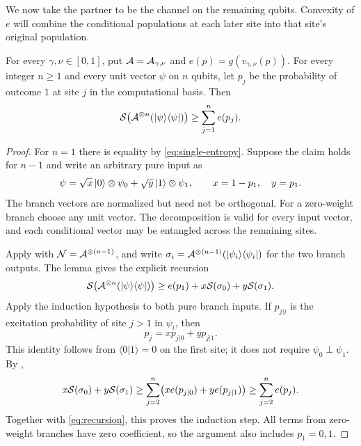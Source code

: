 We now take the partner to be the channel on the remaining qubits.
Convexity of $e$ will combine the conditional populations at each later
site into that site's original population.

\begin{proposition}\label{prop:pure-bound}
For every $\gamma,\nu\in[0,1]$, put $\mathcal A=\mathcal A_{\gamma,\nu}$ and
$e(p)=g(v_{\gamma,\nu}(p))$. For every integer $n\ge1$ and
every unit vector $\psi$ on $n$ qubits,
let $p_j$ be the probability of outcome $1$ at site $j$ in the
computational basis. Then
\begin{equation}\label{eq:pure-bound}
 \mathcal S\bigl(\mathcal A^{\otimes n}(\lvert \psi\rangle\langle \psi\rvert)\bigr)
 \ge\sum_{j=1}^n e(p_j).
\end{equation}
\end{proposition}

\begin{proof}
For $n=1$ there is equality by \eqref{eq:single-entropy}. Suppose the
claim holds for $n-1$ and write an arbitrary pure input as
\begin{equation}\label{eq:branch-decomposition}
 \psi=\sqrt x\,\lvert 0\rangle\otimes\psi_0
          +\sqrt y\,\lvert 1\rangle\otimes\psi_1,
 \qquad x=1-p_1,\quad y=p_1.
\end{equation}
The branch vectors are normalized but need not be orthogonal. For a
zero-weight branch choose any unit vector. The decomposition is valid
for every input vector, and each conditional vector may be entangled
across the remaining sites.

Apply  with
$\mathcal N=\mathcal A^{\otimes(n-1)}$, and write
$\sigma_i=\mathcal A^{\otimes(n-1)}(\lvert \psi_i\rangle\langle \psi_i\rvert)$ for the two branch
outputs. The lemma gives the explicit recursion
\begin{equation}\label{eq:recursion}
 \mathcal S\bigl(\mathcal A^{\otimes n}(\lvert \psi\rangle\langle \psi\rvert)\bigr)
 \ge e(p_1)+x\mathcal S(\sigma_0)+y\mathcal S(\sigma_1).
\end{equation}
Apply the induction hypothesis to both pure branch inputs. If
$p_{j|i}$ is the excitation probability of site $j>1$ in $\psi_i$,
then
\[
 p_j=xp_{j|0}+yp_{j|1}.
\]
This identity follows from $\langle0|1\rangle=0$ on the first site;
it does not require $\psi_0\perp\psi_1$. By ,
\[
 x\mathcal S(\sigma_0)+y\mathcal S(\sigma_1)
 \ge\sum_{j=2}^n\bigl(xe(p_{j|0})+ye(p_{j|1})\bigr)
 \ge\sum_{j=2}^ne(p_j).
\]
Together with \eqref{eq:recursion}, this proves the induction step.
All terms from zero-weight branches have zero coefficient, so the
argument also includes $p_1=0,1$.
\end{proof}

